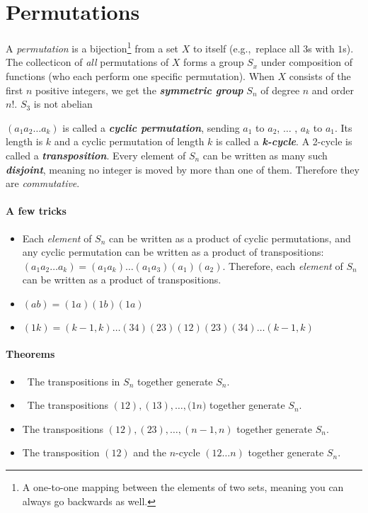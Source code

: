 \documentclass[a4paper,twocolumn,10pt]{article}
\begin{document}
  \section{Permutations}
  A \textit{permutation} is a bijection\footnote{A one-to-one mapping between
  the elements of two sets, meaning you can always go backwards as well.} from a
  set $X$ to itself (e.g.,~replace all $3$s with $1$s).  The collecticon of
  \textit{all} permutations of $X$ forms a group $S_x$ under composition of
  functions (who each perform one specific permutation). When $X$ consists of
  the first $n$ positive integers, we get the \textbf{\textit{symmetric group}}
  $S_n$ of degree $n$ and order $n!$. $S_3$ is not abelian

  $(a_1a_2\ldots a_k)$ is called a \textbf{\textit{cyclic permutation}},
  sending $a_1$ to $a_2$, $\ldots$ , $a_k$ to $a_1$. Its length is $k$ and a
  cyclic permutation of length $k$ is called a \textbf{\textit{k-cycle}}. A
  2-cycle is called a \textbf{\textit{transposition}}. Every element of $S_n$
  can be written as many such \textbf{\textit{disjoint}}, meaning no integer is
  moved by more than one of them. Therefore they are \textit{commutative}.

  \paragraph{A few tricks}
  \begin{itemize}
    \item Each \textit{element} of $S_n$ can be written as a product of cyclic
      permutations, and any cyclic permutation can be written as a product of
      transpositions: $(a_1a_2 \ldots a_k) = (a_1a_k) \ldots (a_1a_3)(a_1)(a_2)$.
      Therefore, each \textit{element} of $S_n$ can be written as a product of
      transpositions.
    \item $(ab) = (1a)(1b)(1a)$
    \item $(1k) = (k-1,k)$$\ldots$$(34) (23) (12) (23) (34)$$\ldots$$(k-1,k)$
  \end{itemize}

  \paragraph{Theorems}
  \begin{itemize}[leftmargin=0.45in]
    \item[\theorem{6.1}] The transpositions in $S_n$ together generate
      $S_n$.

    \item[\theorem{6.2a}] The transpositions $(12), (13), \ldots, ({1n)}$
      together generate $S_n$.

    \item[\theorem{6.2b}] The transpositions $(12), (23), \ldots, (n-1,n)$
      together generate $S_n$.

    \item[\theorem{6.3}] The transposition $(12)$ and the $n$-cycle $(12
      \ldots n)$ together generate $S_n$.
  \end{itemize}
\end{document}
